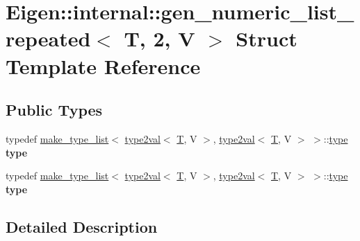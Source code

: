 \hypertarget{struct_eigen_1_1internal_1_1gen__numeric__list__repeated_3_01_t_00_012_00_01_v_01_4}{}\section{Eigen\+:\+:internal\+:\+:gen\+\_\+numeric\+\_\+list\+\_\+repeated$<$ T, 2, V $>$ Struct Template Reference}
\label{struct_eigen_1_1internal_1_1gen__numeric__list__repeated_3_01_t_00_012_00_01_v_01_4}
\subsection*{Public Types}
\begin{DoxyCompactItemize}
\item 
\mbox{\label{struct_eigen_1_1internal_1_1gen__numeric__list__repeated_3_01_t_00_012_00_01_v_01_4_a846c9328d46c502def07e65bf9fc7568}} 
typedef \hyperlink{struct_eigen_1_1internal_1_1make__type__list}{make\+\_\+type\+\_\+list}$<$ \hyperlink{struct_eigen_1_1internal_1_1type2val}{type2val}$<$ \hyperlink{group___sparse_core___module}{T}, V $>$, \hyperlink{struct_eigen_1_1internal_1_1type2val}{type2val}$<$ \hyperlink{group___sparse_core___module}{T}, V $>$ $>$\+::\hyperlink{struct_eigen_1_1internal_1_1type__list}{type} {\bfseries type}
\item 
\mbox{\label{struct_eigen_1_1internal_1_1gen__numeric__list__repeated_3_01_t_00_012_00_01_v_01_4_a846c9328d46c502def07e65bf9fc7568}} 
typedef \hyperlink{struct_eigen_1_1internal_1_1make__type__list}{make\+\_\+type\+\_\+list}$<$ \hyperlink{struct_eigen_1_1internal_1_1type2val}{type2val}$<$ \hyperlink{group___sparse_core___module}{T}, V $>$, \hyperlink{struct_eigen_1_1internal_1_1type2val}{type2val}$<$ \hyperlink{group___sparse_core___module}{T}, V $>$ $>$\+::\hyperlink{struct_eigen_1_1internal_1_1type__list}{type} {\bfseries type}
\end{DoxyCompactItemize}


\subsection{Detailed Description}

